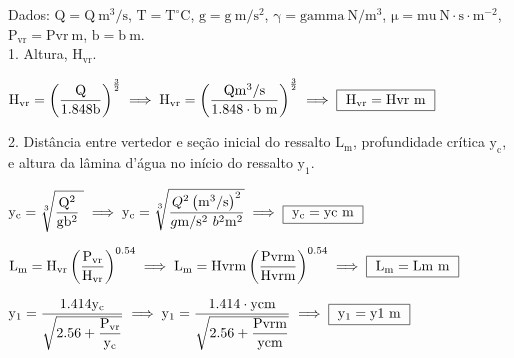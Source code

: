 \documentclass{article}
\newcommand{\myspace}{0.2cm}
\begin{document}

Dados: $\mathrm{Q = {{Q}} \ m^{3}/s}$, $\mathrm{T = {{T}} ^{\circ}C}$, $\mathrm{g = {{g}} \ m/s^{2}}$, $\mathrm{ \gamma = {{gamma}} \ N/m^{3}}$, $\mathrm{ \mu = {{mu}} \ N \! \cdot \! s \cdot m^{-2}}$, $\mathrm{P_{vr} = {{Pvr}} \ m }$, $\mathrm{ b = {{b}} \ m }$.  \\

1. Altura, $\mathrm{ H_{vr} }$.
\vspace{\myspace}

\begin{center}
	$ 
		\mathrm
		{ 
			H_{vr} = \left ( \dfrac{ Q }{ 1.848b } \right )^{ \frac{3}{2} }
		} 
		\implies
		\mathrm
		{
			H_{vr} = \left ( \dfrac{ {{Q}} m^{3}/s}{ 1.848 \cdot {{b}} \ m } \right )^{ \frac{3}{2} }
		} 
		\implies
		\fbox
		{ 
			$\mathrm
			{ 
				H_{vr} = {{Hvr}} \ m
			}$
		} 
	$ 
\end{center}
\vspace{\myspace}

2. Distância entre vertedor e seção inicial do ressalto $\mathrm{ L_{m} }$, profundidade crítica $\mathrm{ y_{c} }$, e altura da lâmina d'água no início do ressalto $\mathrm{ y_{1} }$.
\vspace{\myspace}
\begin{center}
	$ 
		\mathrm
		{ 
			y_{c}=\sqrt[3]{ \dfrac{ \mathrm{Q}^{2} }{ \mathrm{g}\mathrm{b}^2} \ }
		} 
		\implies
		\mathrm
		{
			y_{c} = \sqrt[3]{ \dfrac{ {{Q}}^{2} \left( \mathrm{m^{3}/s} \right )^{2} }{ {{g}} \mathrm{m/s^{2}} \ {{b}}^{2} \mathrm{m^{2}} } }
		} 
		\implies
		\fbox
		{ 
			$\mathrm
			{ 
				y_{c} = {{yc}} \ m
			}$
		} 
	$ 
\end{center}
\vspace{\myspace}

\begin{center}
	$ 
		\mathrm
		{ 
			L_{m} = H_{vr}\left ( \dfrac{P_{vr}}{H_{vr}} \right )^{0.54}
		} 
		\implies
		\mathrm
		{
			L_{m} = {{Hvr}}m\left ( \dfrac{ {{Pvr}}m }{ {{Hvr}}m } \right )^{0.54}
		} 
		\implies
		\fbox
		{ 
			$\mathrm
			{ 
				L_{m} = {{Lm}} \ m
			}$
		} 
	$ 
\end{center}
\vspace{\myspace}

\begin{center}
	$ 
		\mathrm
		{ 
			y_{1} = \dfrac{ 1.414y_{c} }{ \sqrt{ 2.56 + \dfrac{ P_{vr} }{ y_{c} } } }
		} 
		\implies
		\mathrm
		{
			y_{1} = \dfrac{1.414 \cdot {{yc}}m}{ \sqrt{ 2.56 + \dfrac{ {{Pvr}}m }{ {{yc}}m } } }
		} 
		\implies
		\fbox
		{ 
			$\mathrm
			{
				y_{1}= {{y1}} \ m
			}$
		} 
	$ 
\end{center}
\vspace{\myspace}
\end{document}
